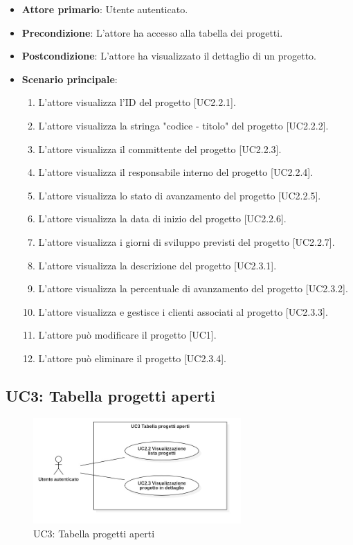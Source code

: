 \begin{itemize}
\item \textbf{Attore primario}: Utente autenticato.
\item \textbf{Precondizione}: L'attore ha accesso alla tabella dei progetti.
\item \textbf{Postcondizione}: L'attore ha visualizzato il dettaglio di un progetto.
\item \textbf{Scenario principale}: 
\begin{enumerate}
\item L'attore visualizza l'ID del progetto [UC2.2.1].
\item L'attore visualizza la stringa "codice - titolo" del progetto [UC2.2.2].
\item L'attore visualizza il committente del progetto [UC2.2.3].
\item L'attore visualizza il responsabile interno del progetto [UC2.2.4].
\item L'attore visualizza lo stato di avanzamento del progetto [UC2.2.5].
\item L'attore visualizza la data di inizio del progetto [UC2.2.6].
\item L'attore visualizza i giorni di sviluppo previsti del progetto [UC2.2.7].
\item L'attore visualizza la descrizione del progetto [UC2.3.1].
\item L'attore visualizza la percentuale di avanzamento del progetto [UC2.3.2].
\item L'attore visualizza e gestisce i clienti associati al progetto [UC2.3.3].
\item L'attore può modificare il progetto [UC1].
\item L'attore può eliminare il progetto [UC2.3.4].
\end{enumerate}
\end{itemize}

\pagebreak

\subsection{UC3: Tabella progetti aperti}
\begin{figure}[!h]
\centering
\includegraphics[width=300px]{../images/UC/.jpeg/UC3.0-tabellaProgettiAperti.jpg}
\caption{UC3: Tabella progetti aperti}
\end{figure}

